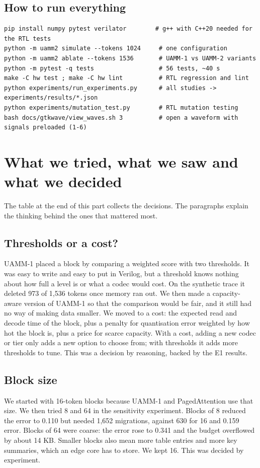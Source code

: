 \documentclass[12pt,a4paper]{report}
\begin{document}
\subsection{How to run everything}\label{sec:6_7}
\begin{lstlisting}
pip install numpy pytest verilator        # g++ with C++20 needed for the RTL tests
python -m uamm2 simulate --tokens 1024     # one configuration
python -m uamm2 ablate --tokens 1536       # UAMM-1 vs UAMM-2 variants
python -m pytest -q tests                  # 56 tests, ~40 s
make -C hw test ; make -C hw lint          # RTL regression and lint
python experiments/run_experiments.py      # all studies -> experiments/results/*.json
python experiments/mutation_test.py        # RTL mutation testing
bash docs/gtkwave/view_waves.sh 3          # open a waveform with signals preloaded (1-6)
\end{lstlisting}
\section{What we tried, what we saw and what we decided}
The table at the end of this part collects the decisions. The paragraphs explain the thinking behind the ones that mattered most.

\subsection{Thresholds or a cost?}
UAMM-1 placed a block by comparing a weighted score with two thresholds. It was easy to write and easy to put in Verilog, but a threshold knows nothing about how full a level is or what a codec would cost. On the synthetic trace it deleted 973 of 1,536 tokens once memory ran out. We then made a capacity-aware version of UAMM-1 so that the comparison would be fair, and it still had no way of making data smaller. We moved to a cost: the expected read and decode time of the block, plus a penalty for quantisation error weighted by how hot the block is, plus a price for scarce capacity. With a cost, adding a new codec or tier only adds a new option to choose from; with thresholds it adds more thresholds to tune. This was a decision by reasoning, backed by the E1 results.

\subsection{Block size}
We started with 16-token blocks because UAMM-1 and PagedAttention use that size. We then tried 8 and 64 in the sensitivity experiment. Blocks of 8 reduced the error to 0.110 but needed 1,652 migrations, against 630 for 16 and 0.159 error. Blocks of 64 were coarse: the error rose to 0.341 and the budget overflowed by about 14 KB. Smaller blocks also mean more table entries and more key summaries, which an edge core has to store. We kept 16. This was decided by experiment.
\end{document}
